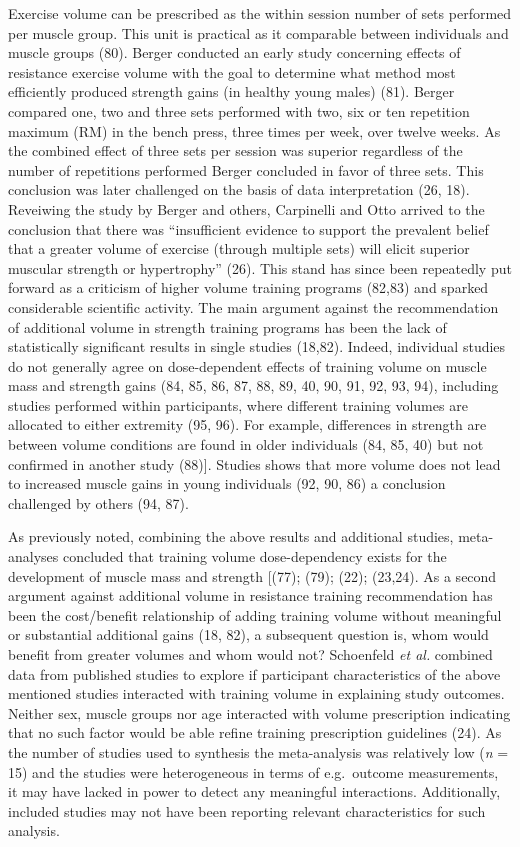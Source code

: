 \documentclass[twoside,10pt]{gihclass} %
\begin{document}
Exercise volume can be prescribed as the within session number of sets performed per muscle group. This unit is practical as it comparable between individuals and muscle groups (80).
Berger conducted an early study concerning effects of resistance exercise volume with the goal to determine what method most efficiently produced strength gains (in healthy young males) (81). Berger compared one, two and three sets performed with two, six or ten repetition maximum (RM) in the bench press, three times per week, over twelve weeks. As the combined effect of three sets per session was superior regardless of the number of repetitions performed Berger concluded in favor of three sets. This conclusion was later challenged on the basis of data interpretation
(26, 18).
Reveiwing the study by Berger and others, Carpinelli and Otto arrived to the conclusion that there was ``insufficient evidence to support the prevalent belief that a greater volume of exercise (through multiple sets) will elicit superior muscular strength or hypertrophy'' (26). This stand has since been repeatedly put forward as a criticism of higher volume training programs
(82,83) and sparked considerable scientific activity. The main argument against the recommendation of additional volume in strength training programs has been the lack of statistically significant results in single studies (18,82).
Indeed, individual studies do not generally agree on dose-dependent effects of training volume on muscle mass and strength gains
(84, 85, 86, 87, 88, 89, 40, 90, 91, 92, 93, 94),
including studies performed within participants, where different training volumes are allocated to either extremity
(95, 96).
For example, differences in strength are between volume conditions are found in older individuals
(84, 85, 40)
but not confirmed in another study
(88){]}.
Studies shows that more volume does not lead to increased muscle gains in young individuals
(92, 90, 86)
a conclusion challenged by others
(94, 87).

As previously noted, combining the above results and additional studies, meta-analyses concluded that training volume dose-dependency exists for the development of muscle mass and strength
{[}(77);
(79);
(22);
(23,24).
As a second argument against additional volume in resistance training recommendation has been the cost/benefit relationship of adding training volume without meaningful or substantial additional gains
(18, 82),
a subsequent question is, whom would benefit from greater volumes and whom would not?
Schoenfeld \emph{et al.} combined data from published studies to explore if participant characteristics of the above mentioned studies interacted with training volume in explaining study outcomes. Neither sex, muscle groups nor age interacted with volume prescription indicating that no such factor would be able refine training prescription guidelines
(24).
As the number of studies used to synthesis the meta-analysis was relatively low (\emph{n} = 15) and the studies were heterogeneous in terms of e.g.~outcome measurements, it may have lacked in power to detect any meaningful interactions. Additionally, included studies may not have been reporting relevant characteristics for such analysis.
\end{document}
